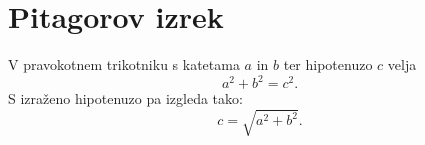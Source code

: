 \documentclass{article}
\begin{document}
\section*{Pitagorov izrek}
V pravokotnem trikotniku s katetama \(a\) in \(b\) ter hipotenuzo \(c\) velja
\[ a^2 + b^2 = c^2 . \]
S izraženo hipotenuzo pa izgleda tako:
\[ c = \sqrt{a^2 + b^2} . \]
\end{document}
